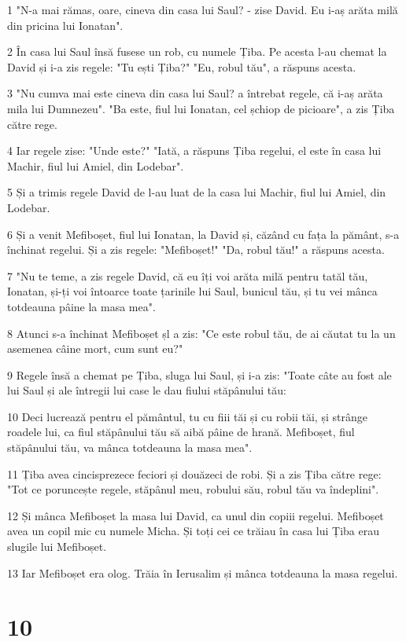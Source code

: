 \par 1 "N-a mai rămas, oare, cineva din casa lui Saul? - zise David. Eu i-aș arăta milă din pricina lui Ionatan".
\par 2 În casa lui Saul însă fusese un rob, cu numele Țiba. Pe acesta l-au chemat la David și i-a zis regele: "Tu ești Țiba?" "Eu, robul tău", a răspuns acesta.
\par 3 "Nu cumva mai este cineva din casa lui Saul? a întrebat regele, că i-aș arăta mila lui Dumnezeu". "Ba este, fiul lui Ionatan, cel șchiop de picioare", a zis Țiba către rege.
\par 4 Iar regele zise: "Unde este?" "Iată, a răspuns Țiba regelui, el este în casa lui Machir, fiul lui Amiel, din Lodebar".
\par 5 Și a trimis regele David de l-au luat de la casa lui Machir, fiul lui Amiel, din Lodebar.
\par 6 Și a venit Mefiboșet, fiul lui Ionatan, la David și, căzând cu fața la pământ, s-a închinat regelui. Și a zis regele: "Mefiboșet!" "Da, robul tău!" a răspuns acesta.
\par 7 "Nu te teme, a zis regele David, că eu îți voi arăta milă pentru tatăl tău, Ionatan, și-ți voi întoarce toate țarinile lui Saul, bunicul tău, și tu vei mânca totdeauna pâine la masa mea".
\par 8 Atunci s-a închinat Mefiboșet șl a zis: "Ce este robul tău, de ai căutat tu la un asemenea câine mort, cum sunt eu?"
\par 9 Regele însă a chemat pe Țiba, sluga lui Saul, și i-a zis: "Toate câte au fost ale lui Saul și ale întregii lui case le dau fiului stăpânului tău:
\par 10 Deci lucrează pentru el pământul, tu cu fiii tăi și cu robii tăi, și strânge roadele lui, ca fiul stăpânului tău să aibă pâine de hrană. Mefiboșet, fiul stăpânului tău, va mânca totdeauna la masa mea".
\par 11 Țiba avea cincisprezece feciori și douăzeci de robi. Și a zis Țiba către rege: "Tot ce poruncește regele, stăpânul meu, robului său, robul tău va îndeplini".
\par 12 Și mânca Mefiboșet la masa lui David, ca unul din copiii regelui. Mefiboșet avea un copil mic cu numele Micha. Și toți cei ce trăiau în casa lui Țiba erau slugile lui Mefiboșet.
\par 13 Iar Mefiboșet era olog. Trăia în Ierusalim și mânca totdeauna la masa regelui.

\chapter{10}

